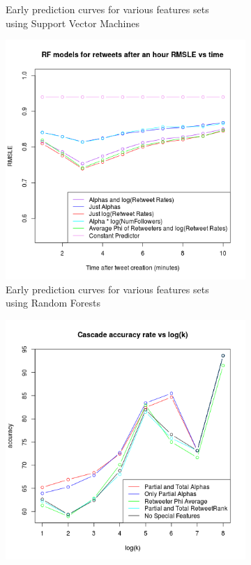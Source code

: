 \begin{figure}
\begin{subfigure}[b]{0.45\textwidth}
    \caption{Early prediction curves for various features sets\\ using Support Vector Machines}
    \label{fig:svmattempts}  
  \end{subfigure}
  \begin{subfigure}[b]{0.45\textwidth}
    \includegraphics[width=\textwidth]{../src/Analysis/rfattempts.png}
    \caption{Early prediction curves for various features sets \\using Random Forests}
    \label{fig:rfattempts}  
  \end{subfigure}%
  \begin{subfigure}[b]{0.45\textwidth}
    \includegraphics[width=\textwidth]{../src/Analysis/jurerocks.png}

\end{subfigure}
\end{figure}
